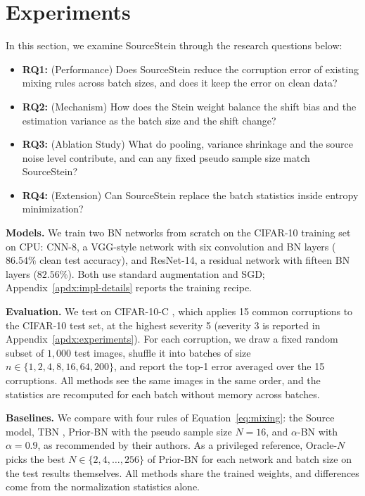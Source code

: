 \section{Experiments}
In this section, we examine SourceStein through the research questions below:
\begin{itemize}[leftmargin=*]
    \item \textbf{RQ1:} (Performance) Does SourceStein reduce the corruption error of existing mixing rules across batch sizes, and does it keep the error on clean data?
    \item \textbf{RQ2:} (Mechanism) How does the Stein weight balance the shift bias and the estimation variance as the batch size and the shift change?
    \item \textbf{RQ3:} (Ablation Study) What do pooling, variance shrinkage and the source noise level contribute, and can any fixed pseudo sample size match SourceStein?
    \item \textbf{RQ4:} (Extension) Can SourceStein replace the batch statistics inside entropy minimization?
\end{itemize}

\textbf{Models.} We train two BN networks from scratch on the CIFAR-10 training set on CPU: CNN-8, a VGG-style network \cite{VGG} with six convolution and BN layers ($86.54\%$ clean test accuracy), and ResNet-14, a residual network \cite{ResNet} with fifteen BN layers ($82.56\%$).
Both use standard augmentation and SGD; Appendix~\ref{apdx:impl-details} reports the training recipe.

\textbf{Evaluation.} We test on CIFAR-10-C \cite{CIFAR10-C}, which applies 15 common corruptions to the CIFAR-10 test set, at the highest severity 5 (severity 3 is reported in Appendix~\ref{apdx:experiments}).
For each corruption, we draw a fixed random subset of $1{,}000$ test images, shuffle it into batches of size $n \in \{1, 2, 4, 8, 16, 64, 200\}$, and report the top-1 error averaged over the 15 corruptions.
All methods see the same images in the same order, and the statistics are recomputed for each batch without memory across batches.

\textbf{Baselines.} We compare with four rules of Equation~\ref{eq:mixing}: the Source model, TBN \cite{PredictionBN}, Prior-BN \cite{BN-Adapt} with the pseudo sample size $N{=}16$, and $\alpha$-BN \cite{AlphaBN} with $\alpha{=}0.9$, as recommended by their authors.
As a privileged reference, Oracle-$N$ picks the best $N \in \{2, 4, \ldots, 256\}$ of Prior-BN for each network and batch size on the test results themselves.
All methods share the trained weights, and differences come from the normalization statistics alone.


